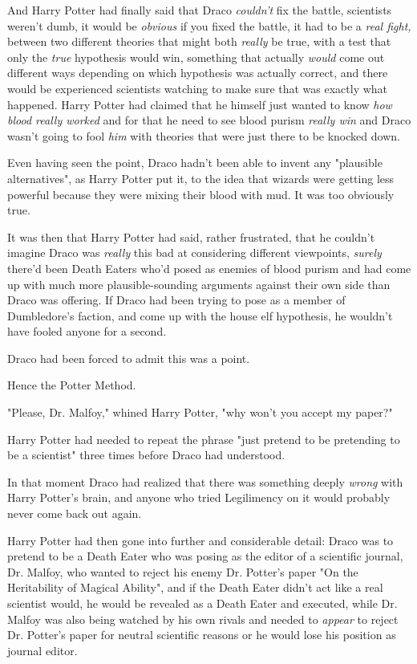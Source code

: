 And Harry Potter had finally said that Draco \emph{couldn't} fix the battle,
scientists weren't dumb, it would be \emph{obvious} if you fixed the battle, it
had to be a \emph{real fight,} between two different theories that might both
\emph{really} be true, with a test that only the \emph{true} hypothesis would
win, something that actually \emph{would} come out different ways depending on
which hypothesis was actually correct, and there would be experienced
scientists watching to make sure that was exactly what happened. Harry Potter
had claimed that he himself just wanted to know \emph{how blood really worked}
and for that he need to see blood purism \emph{really win} and Draco wasn't
going to fool \emph{him} with theories that were just there to be knocked down.

Even having seen the point, Draco hadn't been able to invent any "plausible
alternatives", as Harry Potter put it, to the idea that wizards were getting
less powerful because they were mixing their blood with mud. It was too
obviously true.

It was then that Harry Potter had said, rather frustrated, that he couldn't
imagine Draco was \emph{really} this bad at considering different viewpoints,
\emph{surely} there'd been Death Eaters who'd posed as enemies of blood purism
and had come up with much more plausible-sounding arguments against their own
side than Draco was offering. If Draco had been trying to pose as a member of
Dumbledore's faction, and come up with the house elf hypothesis, he wouldn't
have fooled anyone for a second.

Draco had been forced to admit this was a point.

Hence the Potter Method.

"Please, Dr. Malfoy," whined Harry Potter, "why won't you accept my paper?"

Harry Potter had needed to repeat the phrase "just pretend to be pretending to
be a scientist" three times before Draco had understood.

In that moment Draco had realized that there was something deeply \emph{wrong}
with Harry Potter's brain, and anyone who tried Legilimency on it would
probably never come back out again.

Harry Potter had then gone into further and considerable detail: Draco was to
pretend to be a Death Eater who was posing as the editor of a scientific
journal, Dr. Malfoy, who wanted to reject his enemy Dr. Potter's paper "On the
Heritability of Magical Ability", and if the Death Eater didn't act like a real
scientist would, he would be revealed as a Death Eater and executed, while Dr.
Malfoy was also being watched by his own rivals and needed to \emph{appear} to
reject Dr. Potter's paper for neutral scientific reasons or he would lose his
position as journal editor.

